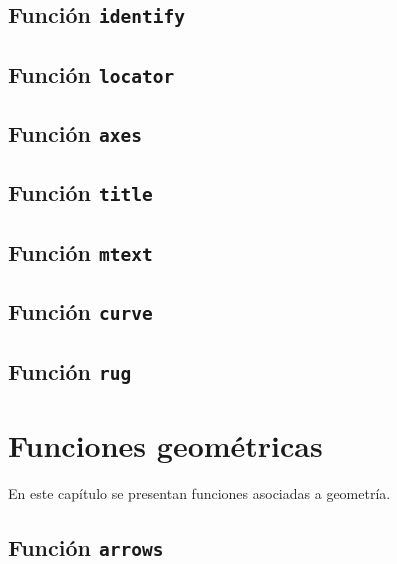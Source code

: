 \documentclass[10pt,]{krantz}
\begin{document}
\section{\texorpdfstring{Función \texttt{identify} 
}{Función identify  }}\label{funcion-identify}

\section{\texorpdfstring{Función \texttt{locator}
}{Función locator }}\label{funcion-locator}

\section{\texorpdfstring{Función \texttt{axes} 
}{Función axes  }}\label{funcion-axes}

\section{\texorpdfstring{Función \texttt{title} 
}{Función title  }}\label{funcion-title}

\section{\texorpdfstring{Función \texttt{mtext}
}{Función mtext }}\label{funcion-mtext}

\section{\texorpdfstring{Función \texttt{curve} 
}{Función curve  }}\label{funcion-curve}

\section{\texorpdfstring{Función \texttt{rug}
}{Función rug }}\label{funcion-rug}

\chapter{Funciones geométricas}\label{funciones-geometricas}

En este capítulo se presentan funciones asociadas a geometría.

\section{\texorpdfstring{Función \texttt{arrows} 
}{Función arrows  }}\label{funcion-arrows}
\end{document}
